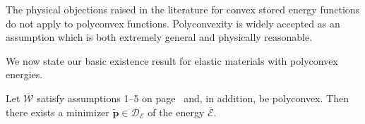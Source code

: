 \begin{Remark}
\label{rem:polyconvexity-physical-reasonableness}
The physical objections raised in the literature for convex stored energy functions do not apply to polyconvex functions. Polyconvexity is widely accepted as an assumption which is both extremely general and physically reasonable.
\end{Remark}

We now state our basic existence result for elastic materials with polyconvex energies.

\begin{Theorem}
\label{thm:polyconvex-energy-equilibrium-existence}
Let $\overline{\mathcal{W}}$ satisfy assumptions 1--5 on page~\pageref{eq:elasticity-stored-energy-p-growth-bound} and, in addition, be polyconvex. Then there exists a minimizer $\widetilde{\bm{p}}\in\mathcal{D}_{\mathcal{E}}$ of the energy $\overline{\mathcal{E}}$.
\end{Theorem}

